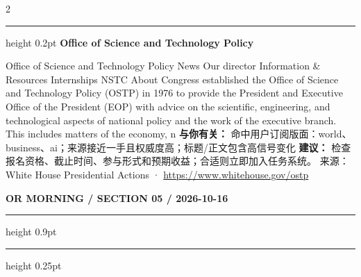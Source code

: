 \documentclass[10.5pt]{ctexart}
\begin{document}
\begin{multicols}{2}
\vspace{2mm}
\hrule height 0.2pt
\vspace{2mm}
{\large\bfseries Office of Science and Technology Policy}\par
Office of Science and Technology Policy News Our director Information \& Resources Internships NSTC About Congress established the Office of Science and Technology Policy (OSTP) in 1976 to provide the President and Executive Office of the President (EOP) with advice on the scientific, engineering, and technological aspects of national policy and the work of the executive branch. This includes matters of the economy, n
\textbf{与你有关：} 命中用户订阅版面：world、business、ai；来源接近一手且权威度高；标题/正文包含高信号变化
\textbf{建议：} 检查报名资格、截止时间、参与形式和预期收益；合适则立即加入任务系统。
{\footnotesize\color{ormuted} 来源：White House Presidential Actions · \url{https://www.whitehouse.gov/ostp}}
\end{multicols}
\newpage
{\small\bfseries OR MORNING / SECTION 05 / 2026-10-16}
\vspace{2mm}
\hrule height 0.9pt
\vspace{1.5mm}
\hrule height 0.25pt
\vspace{4mm}
\end{document}
